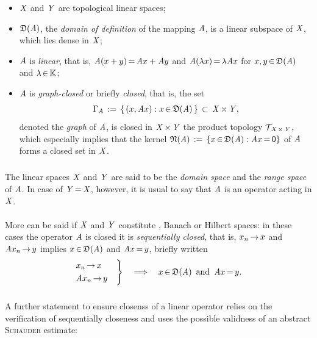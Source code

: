 \documentclass[11pt,twoside]{article}
\begin{document}
\begin{itemize}[leftmargin=12mm]
\item[(C-1)]
$\mathit{X}$ and $\mathit{Y}$ are topological linear spaces;
\item[(C-2)]
$\mathfrak{D}(\mathit{A})$,
the \textit{domain of definition} of the mapping $\mathit{A}$,
is a linear subspace of $\mathit{X}$,
which lies dense in $\mathit{X}$;
\item[(C-3)]
$\mathit{A}$ is \textit{linear},
that is,
$\mathit{A}(x+y) {\,=\,} \mathit{A} x + \mathit{A} y$ and $\mathit{A}(\lambda x) {\,=\,} \lambda \mathit{A} x$
for $x,y {\,\in\,} \mathfrak{D}(\mathit{A})$ and $\lambda {\,\in\,} {\mathbb{K}}$;
\item[(C-4)]
$\mathit{A}$ is \textit{graph-closed} or briefly \textit{closed},
that is,
the set
\[
\Gamma_{\mathit{A}} \,:=\,
\{\,(x,\mathit{A} x): x {\,\in\,} \mathfrak{D}(\mathit{A})\,\} \; {\,\subset\,} \; \mathit{X} {\,\times\,} \mathit{Y},
\]
denoted the \textit{graph} of $\mathit{A}$,
is closed in $\mathit{X} {\,\times\,} \mathit{Y}$
{\wrt} the product topology $\mathcal{T}_{\,\mathit{X} {\,\times\,} \mathit{Y}}$,
which especially implies that
the kernel $\mathfrak{N}(\mathit{A}) \,:=\, \{ x {\,\in\,} \mathfrak{D}(\mathit{A}): \mathit{A} x {\,=\,} {\mathsf{0}} \}$
of $\mathit{A}$ forms a closed set in $\mathit{X}$.
\end{itemize}

\subparagraph{} %
The linear spaces $\mathit{X}$ and $\mathit{Y}$ are said
to be the \textit{domain space} and the \textit{range space}
of $\mathit{A}$.
In case of $\mathit{Y} {\,=\,} \mathit{X}$,
however,
it is usual to say that $\mathit{A}$ is an operator acting in $\mathit{X}$.

\paragraph{} %
More can be said if $\mathit{X}$ and $\mathit{Y}$ constitute {\FRECHET}, Banach
or Hilbert spaces:
in these cases the operator $\mathit{A}$ is closed \iff
it is \textit{sequentially closed},
that is,
$x_n {\,\to\,} x$ and $\mathit{A} x_n {\,\to\,} y$ implies
$x {\,\in\,} \mathfrak{D}(\mathit{A})$ and $\mathit{A} x {\,=\,} y$,
briefly written
\[
\begin{rcases}
 x_n       {\,\to\,} x \quad \\
 \mathit{A} x_n {\,\to\,} y \quad \\
\end{rcases}
\quad \Longrightarrow \quad
x {\,\in\,} \mathfrak{D}(\mathit{A}) \, \mbox{ and } \, \mathit{A} x {\,=\,} y.
\]

\subparagraph{} %
A further statement to ensure closenss of a linear operator
relies on the verification of sequentially closeness
and uses the possible validness of an abstract \textsc{Schauder} estimate:
\end{document}
